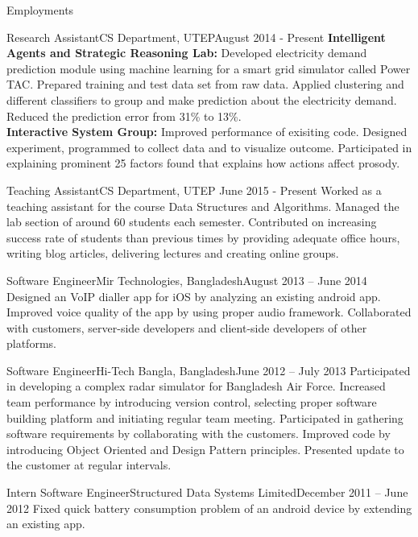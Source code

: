 \documentclass[]{mcdowellcv}
\begin{document}
	\begin{cvsection}{Employments}
		
		\begin{cvsubsection}{Research Assistant}{CS Department, UTEP}{August 2014 - Present}
			\textbf{Intelligent Agents and Strategic Reasoning Lab:} Developed electricity demand prediction module using machine learning for a smart grid simulator called Power TAC. Prepared training and test data set from raw data. Applied clustering and different classifiers to group and make prediction about the electricity demand. Reduced the prediction error from 31\% to 13\%. \\
			\textbf{Interactive System Group:} Improved performance of exisiting code. Designed experiment, programmed to collect data and to visualize outcome. Participated in explaining prominent 25 factors found that explains how actions affect prosody.
		\end{cvsubsection}
		
		\begin{cvsubsection}{Teaching Assistant}{CS Department, UTEP }{June 2015 - Present}
			Worked as a teaching assistant for the course Data Structures and Algorithms. Managed the lab section of around 60 students each semester. Contributed on increasing success rate of students than previous times by providing adequate office hours, writing blog articles, delivering lectures and creating online groups.
		\end{cvsubsection}
		
		\begin{cvsubsection}{Software Engineer}{Mir Technologies, Bangladesh}{August 2013 -- June 2014}
		Designed an VoIP dialler app for iOS by analyzing an existing android app. Improved voice quality of the app by using proper audio framework. Collaborated with customers, server-side developers and client-side developers of other platforms. 
\end{cvsubsection}		
		\begin{cvsubsection}{Software Engineer}{Hi-Tech Bangla, Bangladesh}{June 2012 -- July 2013}	
Participated in developing a complex radar simulator for Bangladesh Air Force. Increased team performance by introducing version control, selecting proper software building platform and initiating regular team meeting. Participated in gathering software requirements by collaborating with the customers. Improved code by introducing Object Oriented and Design Pattern principles. Presented update to the customer at regular intervals.
		\end{cvsubsection}
		
		\begin{cvsubsection}{Intern Software Engineer}{Structured Data Systems Limited}{December 2011 -- June 2012}	
			Fixed quick battery consumption problem of an android device by extending an existing app.
		\end{cvsubsection}		
	\end{cvsection}
	
\end{document}
